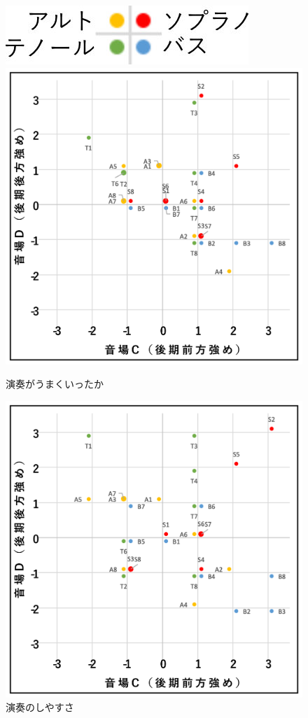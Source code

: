 \documentclass[11pt,a4j]{jreport}
\begin{document}
\begin{figure}[H]
  \begin{minipage}{1\linewidth}
    \centering
    \includegraphics[scale=.7]{images/subjectiveExp/scat_0_legend.jpg}
  \end{minipage}

  \begin{minipage}{0.5\linewidth}
    \centering
    \includegraphics[width=.9\linewidth]{images/subjectiveExp/scat_late_12wellDone.png}
    \caption*{演奏がうまくいったか}
  \end{minipage}%
  \begin{minipage}{0.5\linewidth}
    \centering
    \includegraphics[width=.9\linewidth]{images/subjectiveExp/scat_late_13easiness.png}
    \caption*{演奏のしやすさ}
  \end{minipage}


\end{figure}
\end{document}
